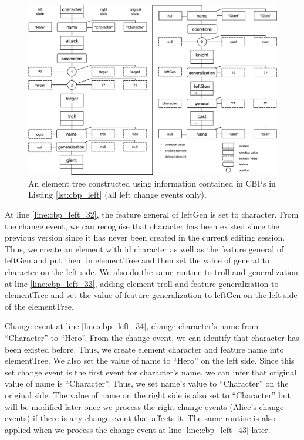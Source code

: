 \begin{figure}[ht]
  \centering
  \includegraphics[width=\linewidth]{element_tree_game_left}
  \caption{An element tree constructed using information contained in CBPs in Listing \ref{lst:cbp_left} (all left change events only).}
  \label{fig:left_element_tree_diagram}
\end{figure} 

At line \ref{line:cbp_left_32}, the feature \textsf{general} of \textsf{leftGen} is set to \textsf{character}. From the change event, we can recognise that \textsf{character} has been existed since the previous version since it has never been created in the current editing session. Thus, we create an element with id \textsf{character} as well as the feature \textsf{general} of \textsf{leftGen} and put them in \textsf{elementTree} and then set the value of \textsf{general} to \textsf{character} on the left side. We also do the same routine to \textsf{troll} and \textsf{generalization} at line \ref{line:cbp_left_33}, adding element \textsf{troll} and feature \textsf{generalization} to \textsf{elementTree} and set the value of feature \textsf{generalization} to \textsf{leftGen} on the left side of the \textsf{elementTree}. 

Change event at line \ref{line:cbp_left_34}, change \textsf{character}'s \textsf{name} from ``Character'' to ``Hero''. From the change event, we can identify that \textsf{character} has been existed before. Thus, we create element \textsf{character} and feature \textsf{name} into \textsf{elementTree}. We also set the value of \textsf{name} to ``Hero'' on the left side. Since this set change event is the first event for \textsf{character}'s \textsf{name}, we can infer that original value of \textsf{name} is ``Character''. Thus, we set \textsf{name}'s value to ``Character'' on the original side. The value of \textsf{name} on the right side is also set to ``Character'' but will be modified later once we process the right change events (Alice's change events) if there is any change event that affects it. The same routine is also applied when we process the change event at line \ref{line:cbp_left_43} later.

